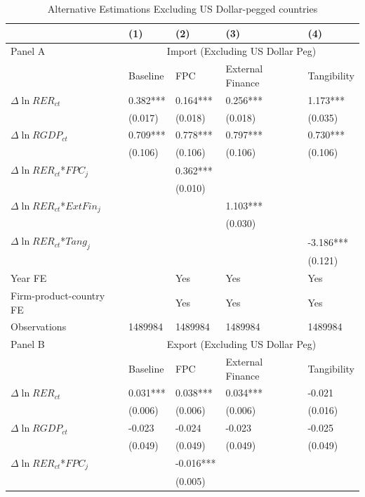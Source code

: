 \documentclass[12pt]{article}
\begin{document}
\begin{table}[htbp]
	\centering
	\caption{Alternative Estimations Excluding US Dollar-pegged countries}
	\begin{threeparttable}
	\begin{tabular}{lllll}
		\toprule
		& (1)   & (2)   & (3)   & (4) \\
		\midrule
		Panel A & \multicolumn{4}{c}{Import (Excluding US Dollar Peg)} \\
		& Baseline & FPC   & External Finance & Tangibility \\
		\midrule
		$\Delta \ln RER_{ct}$ & 0.382*** & 0.164*** & 0.256*** & 1.173*** \\
		& (0.017) & (0.018) & (0.018) & (0.035) \\
		$\Delta \ln RGDP_{ct}$ & 0.709*** & 0.778*** & 0.797*** & 0.730*** \\
		& (0.106) & (0.106) & (0.106) & (0.106) \\
		$\Delta \ln RER_{ct}$*$FPC_{j}$ &       & 0.362*** &       &  \\
		&       & (0.010) &       &  \\
		$\Delta \ln RER_{ct}$*$ExtFin_{j}$ &       &       & 1.103*** &  \\
		&       &       & (0.030) &  \\
		$\Delta \ln RER_{ct}$*$Tang_{j}$ &       &       &       & -3.186*** \\
		&       &       &       & (0.121) \\
		Year FE  &       & Yes   & Yes   & Yes \\
		Firm-product-country FE &       & Yes   & Yes   & Yes \\
		Observations & 1489984 & 1489984 & 1489984 & 1489984 \\
		\midrule
		Panel B & \multicolumn{4}{c}{Export (Excluding US Dollar Peg)} \\
		& Baseline & FPC   & External Finance & Tangibility \\
		\midrule
		$\Delta \ln RER_{ct}$ & 0.031*** & 0.038*** & 0.034*** & -0.021 \\
		& (0.006) & (0.006) & (0.006) & (0.016) \\
		$\Delta \ln RGDP_{ct}$ & -0.023 & -0.024 & -0.023 & -0.025 \\
		& (0.049) & (0.049) & (0.049) & (0.049) \\
		$\Delta \ln RER_{ct}$*$FPC_{j}$ &       & -0.016*** &       &  \\
		&       & (0.005) &       &  \\

\end{tabular}
\end{threeparttable}
\end{table}
\end{document}
